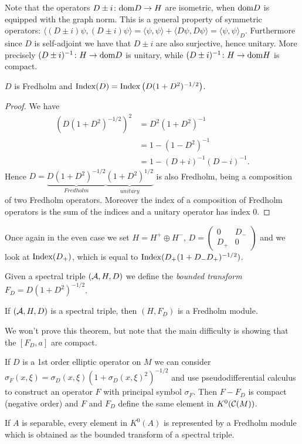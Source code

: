 \noindent Note that the operators $D\pm i\colon\mathrm{dom} D\to H$ are isometric, when $\mathrm{dom} D$ is equipped with the graph norm. This is a general property of symmetric operators: $\langle (D\pm i)\psi,(D\pm i)\psi\rangle=\langle\psi,\psi\rangle+\langle D\psi,D\psi\rangle=\langle\psi,\psi\rangle_D$. Furthermore since $D$ is self-adjoint we have that $D\pm i$ are also surjective, hence unitary. More precisely $(D\pm i)^{-1}\colon H\to\mathrm{dom} D$ is unitary, while $(D\pm i)^{-1}\colon H\to\mathrm{dom} H$ is compact.

\begin{proposition}
 $D$ is Fredholm and $\mathrm{Index}(D)=\mathrm{Index}\left(D(1+D^2)^{-1/2}\right)$.
\end{proposition}
\begin{proof}
 We have \begin{align*}
          \left(D(1+D^2)^{-1/2}\right)^2&=D^2(1+D^2)^{-1} \\
          &= 1-(1-D^2)^{-1} \\
          &= 1-(D+i)^{-1}(D-i)^{-1}.
         \end{align*}
Hence $D=\underbrace{D(1+D^2)^{-1/2}}_{Fredholm}\underbrace{(1+D^2)^{1/2}}_{unitary}$ is also Fredholm, being a composition of two Fredholm operators. Moreover the index of a composition of Fredholm operators is the sum of the indices and a unitary operator has index $0$.
\end{proof}

\noindent Once again in the even case we set $H=H^+\oplus H^-$, $D=\begin{pmatrix} 0 & D_- \\ D_+ & 0 \end{pmatrix}$ and we look at $\mathrm{Index}(D_+)$, which is equal to $\mathrm{Index}(D_+(1+D_-D_+)^{-1/2})$.

\begin{definition}
 Given a spectral triple $(\mathcal{A},H,D)$ we define the \emph{bounded transform} $F_D=D(1+D^2)^{-1/2}$.
\end{definition}
\begin{theorem}
 If $(\mathcal{A},H,D)$ is a spectral triple, then $(H,F_D)$ is a Fredholm module. 
\end{theorem}
\noindent We won't prove this theorem, but note that the main difficulty is showing that the $[F_D,a]$ are compact. 

\noindent If $D$ is a 1st order elliptic operator on $M$ we can consider $\sigma_F(x,\xi)=\sigma_D(x,\xi)(1+\sigma_D(x,\xi)^2)^{-1/2}$ and use pseudodifferential calculus to construct an operator $F$ with principal symbol $\sigma_F$. Then $F-F_D$ is compact (negative order) and $F$ and $F_D$ define the same element in $K^0(\mathcal{C}(M))$.

\begin{theorem}
 If $A$ is separable, every element in $K^0(A)$ is represented by a Fredholm module which is obtained as the bounded transform of a spectral triple.
\end{theorem}



















